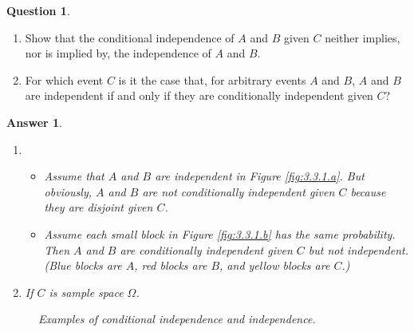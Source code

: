 \documentclass[utf8]{article}
\theoremstyle{definition}%
\newtheorem{question}{Question} %
\theoremstyle{plain}%
\newtheorem{answer}{Answer} %
\begin{document}
\begin{question} ~
    \begin{enumerate}[label=(\alph*)]
        \item Show that the conditional independence of $A$ and $B$ given $C$ neither implies, nor is implied by, the independence of $A$ and $B$.
        \item For which event $C$ is it the case that, for arbitrary events $A$ and $B$, $A$ and $B$ are independent if and only if they are conditionally independent given $C$?
    \end{enumerate}
\end{question}
\begin{answer} ~
    \begin{enumerate}[label=(\alph*)]
        \item 
            \begin{itemize}
                \item Assume that $A$ and $B$ are independent in Figure \ref{fig:3.3.1.a}. But obviously, $A$ and $B$ are not conditionally independent given $C$ because they are disjoint given $C$.
                \item Assume each small block in Figure \ref{fig:3.3.1.b} has the same probability. Then $A$ and $B$ are conditionally independent given $C$ but not independent. (Blue blocks are $A$, red blocks are $B$, and yellow blocks are $C$.)
            \end{itemize}
        \item If $C$ is sample space $\varOmega$.
    \end{enumerate}
    \begin{figure}[H]
        \centering
        \quad
        \caption{Examples of conditional independence and independence.}
        \label{fig:3.3.1}
    \end{figure}
\end{answer}
\end{document}
